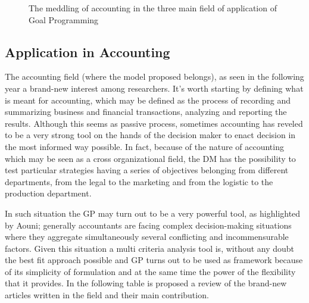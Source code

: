 \begin{doublespace}
\begin{figure}
\begin{center}
\end{center}
\caption{The meddling of accounting in the three main field of application of Goal Programming} \label{fig:accounting}
\end{figure}

\subsection{Application in Accounting}
The accounting field (where the model proposed belongs), as seen in the following year a brand-new interest among researchers. It's worth starting by defining what is meant for accounting, which may be defined as the process of recording and summarizing business and financial transactions, analyzing and reporting the results. Although this seems as passive process, sometimes accounting has reveled to be a very strong tool on the hands of the decision maker\cite{Davidson1961} to enact decision in the most informed way possible. In fact, because of the nature of accounting which may be seen as a cross organizational field, the DM has the possibility to test particular strategies having a series of objectives belonging from different departments, from the legal to the marketing and from the logistic to the production department.

In such situation the GP may turn out to be a very powerful tool, as highlighted by Aouni\cite{Aouni2017}; generally accountants are facing complex decision-making situations where they aggregate simultaneously several conflicting and incommensurable factors. Given this situation a multi criteria analysis tool is, without any doubt the best fit approach possible and GP turns out to be used as framework because of its simplicity of formulation and at the same time the power of the flexibility that it provides. In the following table is proposed a review of the brand-new articles written in the field and their main contribution.


\end{doublespace}
